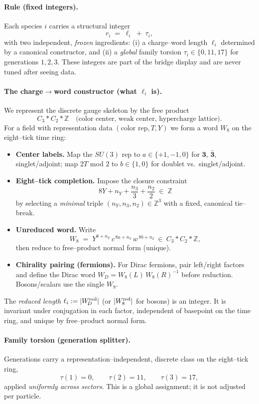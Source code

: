 \documentclass[epjc3]{svjour3}
\begin{document}
\paragraph{Rule (fixed integers).}
Each species $i$ carries a structural integer
\[
r_i \;=\; \ell_i \;+\; \tau_i,
\]
with two independent, \emph{frozen} ingredients:
(i) a charge–word length $\ell_i$ determined by a canonical constructor, and
(ii) a \emph{global} family torsion $\tau_i\in\{0,11,17\}$ for generations $1,2,3$.
These integers are part of the bridge display and are never tuned after seeing data.

\paragraph{The charge$\to$word constructor (what $\ell_i$ is).}
We represent the discrete gauge skeleton by the free product
\[
C_3 * C_2 * \mathbb Z
\quad\text{(color center, weak center, hypercharge lattice).}
\]
For a field with representation data $(\text{color rep},T,Y)$ we form a word $W_8$ on the eight–tick time ring:
\begin{itemize}
  \item \textbf{Center labels.} Map the $SU(3)$ rep to $a\in\{+1,-1,0\}$ for $\mathbf 3$, $\bar{\mathbf 3}$, singlet/adjoint; map $2T$ mod $2$ to $b\in\{1,0\}$ for doublet vs.\ singlet/adjoint.
  \item \textbf{Eight–tick completion.} Impose the closure constraint
        \[
        8Y + n_Y + \frac{n_3}{3} + \frac{n_2}{2}\;\in\;\mathbb Z
        \]
        by selecting a \emph{minimal} triple $(n_Y,n_3,n_2)\in\mathbb Z^3$ with a fixed, canonical tie–break.
  \item \textbf{Unreduced word.} Write
        \[
        W_8 \;=\; Y^{8+n_Y}\,c^{\,8a+n_3}\,w^{\,8b+n_2}\ \in\ C_3 * C_2 * \mathbb Z,
        \]
        then reduce to free–product normal form (unique).
  \item \textbf{Chirality pairing (fermions).} For Dirac fermions, pair left/right factors and define the Dirac word
        $W_{\!D}=W_8(L)\,W_8(R)^{-1}$ before reduction. Bosons/scalars use the single $W_8$.
\end{itemize}
The \emph{reduced length} $\ell_i := |W_{\!D}^{\rm red}|$ (or $|W_8^{\rm red}|$ for bosons) is an integer.
It is invariant under conjugation in each factor, independent of basepoint on the time ring, and unique by free–product normal form.

\paragraph{Family torsion (generation splitter).}
Generations carry a representation–independent, discrete class on the eight–tick ring,
\[
\tau(1)=0,\qquad \tau(2)=11,\qquad \tau(3)=17,
\]
applied \emph{uniformly across sectors}. This is a global assignment; it is not adjusted per particle.
\end{document}
